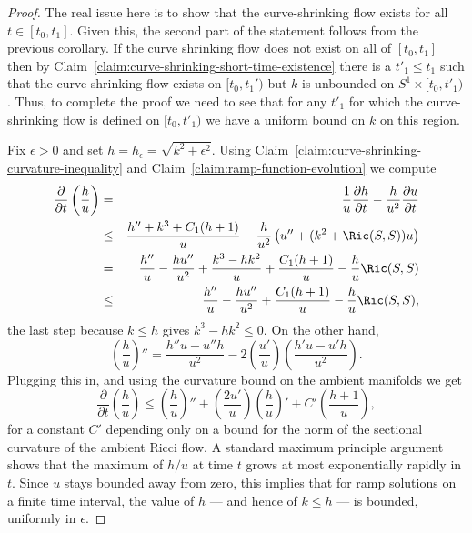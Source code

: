 \begin{proof}
The real issue here is to show that the curve-shrinking flow exists
for all $t\in [t_0,t_1]$. Given this, the second part of the
statement follows from the previous corollary. If the curve
shrinking flow does not exist on all of $[t_0,t_1]$ then by
Claim~\ref{claim:curve-shrinking-short-time-existence} there is a $t'_1\le t_1$ such that the
curve-shrinking flow exists on $[t_0,t_1')$ but $k$ is unbounded on
$S^1\times [t_0,t'_1)$. Thus, to complete the proof we need to see
that for any $t'_1$ for which the curve-shrinking flow is defined on
$[t_0,t'_1)$ we have a uniform bound on $k$ on this region.

Fix $\epsilon>0$ and set $h=h_\epsilon=\sqrt{k^2+\epsilon^2}$. Using
Claim~\ref{claim:curve-shrinking-curvature-inequality} and Claim~\ref{claim:ramp-function-evolution} we compute
\begin{eqnarray*} \frac{\partial}{\partial t}\left(\frac{h}{u}\right)
& = &\frac{1}{u}\frac{\partial
h}{\partial t}-\frac{h}{u^2}\frac{\partial u}{\partial t} \\
& \le & \frac{h''+k^3+C_1(h+1)}{u}-\frac{h}{u^2}\left(u''+(k^2+\Ric(S,S))u\right)
\\
& = & \frac{h''}{u}-\frac{hu''}{u^2}+\frac{k^3-hk^2}{u}+\frac{C_1(h+1)}{u}-\frac{h}{u}\Ric(S,S) \\
& \le & \frac{h''}{u}-\frac{hu''}{u^2}+\frac{C_1(h+1)}{u}-\frac{h}{u}\Ric(S,S),
\end{eqnarray*}
the last step because $k\le h$ gives $k^3-hk^2\le0$.
On the other hand,
$$\left(\frac{h}{u}\right)''=\frac{h''u-u''h}{u^2}-2\left(\frac{u'}{u}\right)
\left(\frac{h'u-u'h}{u^2}\right).$$ Plugging this in, and using the
curvature bound on the ambient manifolds we get
$$\frac{\partial}{\partial
t}\left(\frac{h}{u}\right)\le
\left(\frac{h}{u}\right)''+\left(\frac{2u'}{u}\right)\left(\frac{h}{u}\right)'+C'\left(\frac{h+1}{u}\right),$$
for a constant $C'$ depending only on a bound for the norm of the
sectional curvature of the ambient Ricci flow. A standard maximum
principle argument shows that the maximum of $h/u$ at time $t$ grows
at most exponentially rapidly in $t$. Since $u$ stays bounded away
from zero, this implies that for ramp solutions on a finite time
interval, the value of $h$ — and hence of $k\le h$ — is bounded,
uniformly in $\epsilon$.
\end{proof}




